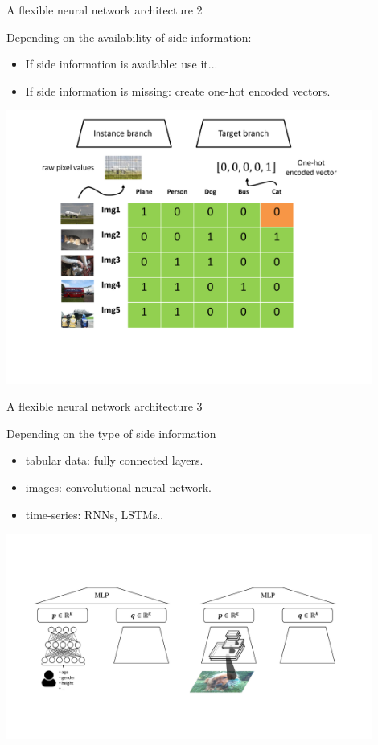 \documentclass[]{beamer}
\begin{document}
\begin{frame}{A flexible neural network architecture 2}

Depending on the availability of side information:
\begin{itemize}
\item[1.] If side information is available: use it... 
\item[2.] If side information is missing: create one-hot encoded vectors.
\end{itemize}


\begin{center}
\includegraphics[width=0.9\textwidth,trim = 0 100 0 0,clip]{Dimitris_figures/regular_one_hot_inputs_example.pdf}
\end{center}

\end{frame}


\begin{frame}{A flexible neural network architecture 3}

 
Depending on the type of side information
\begin{itemize}
\item[1.] tabular data: fully connected layers.
\item[2.] images: convolutional neural network.
\item[3.] time-series: RNNs, LSTMs..
\end{itemize}

\begin{center}
\includegraphics[width=0.9\textwidth,trim = 0 130 0 130,clip]{Dimitris_figures/convnet_plus_fully_connected.pdf}
\end{center}

\end{frame}
\end{document}
